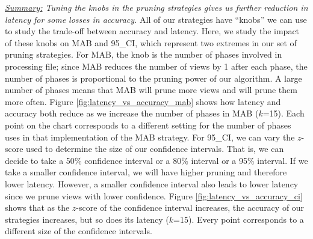 {\em \underline{Summary:} Tuning the knobs in the pruning strategies
gives us further reduction in latency for some losses in accuracy.}
All of our strategies have ``knobs'' we can use to study the
trade-off between accuracy and latency.
Here, we study the impact of these knobs on MAB and 95\_CI, which represent
two extremes in our set of pruning strategies.
For MAB, the knob is the number of phases involved in
processing file; since MAB reduces the number of 
views by 1 after each phase, the number of
phases is proportional to the pruning power of our algorithm.
A large number of phases means that MAB will prune more views and will prune
them more often.
Figure \ref{fig:latency_vs_accuracy_mab} shows how latency and accuracy both
reduce as we increase the number of phases in MAB ($k$=15).
Each point on the chart corresponds to a different setting for the number of
phases uses in that implementation of the MAB strategy.
For 95\_CI, we can vary the $z$-score used
to determine the size of our confidence intervals.
That is, we can decide to take a 50\% confidence interval or a 80\% interval or
a 95\% interval.
If we take a smaller confidence interval, we will have higher pruning and
therefore lower latency.
However, a smaller confidence interval also leads to lower latency since we
prune views with lower confidence.
Figure \ref{fig:latency_vs_accuracy_ci} shows that as the $z$-score of the
confidence interval increases, the accuracy of our strategies increases, but so
does its latency ($k$=15).
Every point corresponds to a different size of the confidence intervals.


